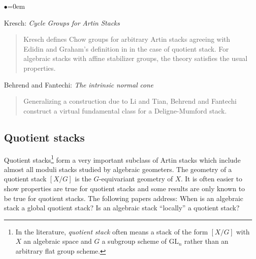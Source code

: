 \begin{list}{$\bullet$}{\leftmargin=0em}
\begin{quote}
\end{quote}
\smallskip
\item
Kresch: \emph{Cycle Groups for Artin Stacks} \cite{kresch_cycle}
\begin{quote}
Kresch defines Chow groups for arbitrary Artin stacks agreeing with Edidin and 
Graham's definition in \cite{edidin-graham} in the case of quotient stack. For 
algebraic stacks with affine stabilizer groups, the theory satisfies the usual 
properties. 
\end{quote}
\smallskip
\item Behrend and Fantechi: \emph{The intrinsic normal cone}
\cite{behrend-fantechi}
\begin{quote}
Generalizing a construction due to Li and Tian, Behrend and Fantechi construct 
a virtual fundamental class for a Deligne-Mumford stack.
\end{quote}
\end{list}

\smallskip

\subsection{Quotient stacks}
\label{subsection-quotient-stacks}

\noindent
Quotient stacks\footnote{In the literature,
\emph{quotient stack} often means a stack of the 
form $[X/G]$ with $X$ an algebraic space and $G$ a subgroup scheme
of $\text{GL}_n$ rather than an arbitrary flat group scheme.}
form a very important subclass of Artin stacks which include almost all moduli 
stacks studied by algebraic geometers. The geometry of a quotient stack 
$[X/G]$ is the $G$-equivariant geometry of $X$. It is often easier to show 
properties are true for quotient stacks and some results are only known to be 
true for quotient stacks. The following papers address: When is an algebraic 
stack a global quotient stack? Is an algebraic stack ``locally'' a quotient 
stack?

